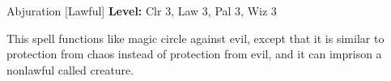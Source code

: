 {Abjuration [Lawful]}
{
	\textbf{Level:}
	Clr 3, Law 3, Pal 3, Wiz 3\\
}
{
	This spell functions like magic circle against evil, except that it is similar to protection from chaos instead of protection from evil, and it can imprison a nonlawful called creature.

}
